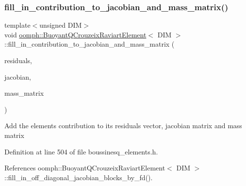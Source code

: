 \subsubsection{\texorpdfstring{fill\+\_\+in\+\_\+contribution\+\_\+to\+\_\+jacobian\+\_\+and\+\_\+mass\+\_\+matrix()}{fill\_in\_contribution\_to\_jacobian\_and\_mass\_matrix()}\hspace{0.1cm}{\footnotesize\ttfamily [2/3]}}
{\footnotesize\ttfamily template$<$unsigned D\+IM$>$ \\
void \hyperlink{classoomph_1_1BuoyantQCrouzeixRaviartElement}{oomph\+::\+Buoyant\+Q\+Crouzeix\+Raviart\+Element}$<$ D\+IM $>$\+::fill\+\_\+in\+\_\+contribution\+\_\+to\+\_\+jacobian\+\_\+and\+\_\+mass\+\_\+matrix (\begin{DoxyParamCaption}\item[{Vector$<$ double $>$ \&}]{residuals,  }\item[{Dense\+Matrix$<$ double $>$ \&}]{jacobian,  }\item[{Dense\+Matrix$<$ double $>$ \&}]{mass\+\_\+matrix }\end{DoxyParamCaption})\hspace{0.3cm}{\ttfamily [inline]}}

Add the element\textquotesingle{}s contribution to its residuals vector, jacobian matrix and mass matrix 

Definition at line 504 of file boussinesq\+\_\+elements.\+h.



References oomph\+::\+Buoyant\+Q\+Crouzeix\+Raviart\+Element$<$ D\+I\+M $>$\+::fill\+\_\+in\+\_\+off\+\_\+diagonal\+\_\+jacobian\+\_\+blocks\+\_\+by\+\_\+fd().

\mbox{\label{classoomph_1_1BuoyantQCrouzeixRaviartElement_a7d22156d87949e4c64d597d60fe00225}} 
